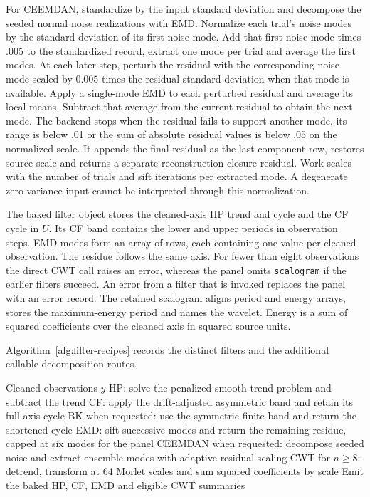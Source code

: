 For CEEMDAN, standardize by the input standard deviation and decompose
the seeded normal noise realizations with EMD. Normalize each trial's
noise modes by the standard deviation of its first noise mode. Add
that first noise mode times .005 to the standardized record, extract
one mode per trial and average the first modes. At each later step, perturb the residual
with the corresponding noise mode scaled by $0.005$ times the residual
standard deviation when that mode is available. Apply a single-mode EMD
to each perturbed residual and average its local means. Subtract that
average from the current residual to obtain the next mode. The backend
stops when the residual fails to support another mode, its range is
below .01 or the sum of absolute residual values is below .05 on the
normalized scale. It appends the final residual as the last component
row, restores source scale and returns a separate reconstruction
closure residual. Work scales with the
number of trials and sift iterations per extracted mode. A degenerate
zero-variance input cannot be interpreted through this normalization.

The baked filter object stores the cleaned-axis HP trend and cycle and
the CF cycle in $U$. Its CF band contains the lower and upper periods
in observation steps. EMD modes form an array of rows, each containing
one value per cleaned observation. The residue follows the same axis.
For fewer than eight observations the direct CWT call raises an error,
whereas the panel omits \texttt{scalogram} if the earlier filters
succeed. An error from a filter that is invoked replaces the panel with
an error record. The retained scalogram aligns period and energy arrays,
stores the maximum-energy period and names the wavelet. Energy is a
sum of squared coefficients over the cleaned axis in squared source
units.

Algorithm~\ref{alg:filter-recipes} records the distinct filters and
the additional callable decomposition routes.
\begin{algorithm}[htbp]
\caption{Apply the filter, mode and wavelet procedures to the same cleaned input with separate output axes.}
\label{alg:filter-recipes}
\begin{algorithmic}[1]
\Require Cleaned observations $y$
\State HP: solve the penalized smooth-trend problem and subtract the trend
\State CF: apply the drift-adjusted asymmetric band and retain its full-axis cycle
\State BK when requested: use the symmetric finite band and return the shortened cycle
\State EMD: sift successive modes and return the remaining residue, capped at six modes for the panel
\State CEEMDAN when requested: decompose seeded noise and extract ensemble modes with adaptive residual scaling
\State CWT for $n\ge8$: detrend, transform at 64 Morlet scales and sum squared coefficients by scale
\State Emit the baked HP, CF, EMD and eligible CWT summaries
\end{algorithmic}
\end{algorithm}

